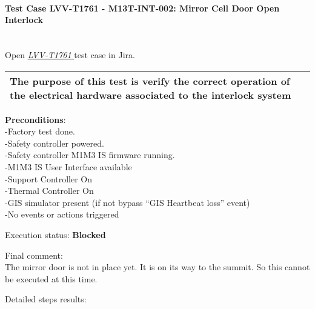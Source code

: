 \documentclass[SE,lsstdraft,STR,toc]{lsstdoc}
\begin{document}
\paragraph{Test Case LVV-T1761 - M13T-INT-002: Mirror Cell Door Open Interlock }\mbox{}\\

Open  \href{https://jira.lsstcorp.org/secure/Tests.jspa#/testCase/LVV-T1761}{\textit{ LVV-T1761 } }
test case in Jira.

\begin{longtable}[]{@{}ll@{}}
\toprule
The purpose of this test is verify the correct operation of the
electrical hardware associated to the interlock system &\tabularnewline
\bottomrule
\end{longtable}

\textbf{ Preconditions}:\\
-Factory test done.\\
-Safety controller powered.\\
-Safety controller M1M3 IS firmware running.\\
-M1M3 IS User Interface available\\
-Support Controller On\\
-Thermal Controller On\\
-GIS simulator present (if not bypass ``GIS Heartbeat loss'' event)\\
-No events or actions triggered

Execution status: {\bf Blocked }

Final comment:\\The mirror door is not in place yet. It is on its way to the summit. So
this cannot be executed at this time.


Detailed steps results:
\end{document}
